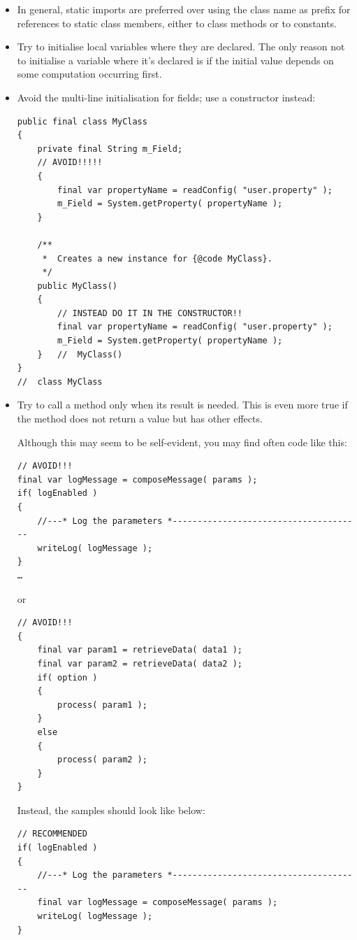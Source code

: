 \documentclass[11pt,a4paper, titlepage, parskip=half, headsepline, footsepline, cleardoublepage=current, headheight=1cm]{scrbook}
\begin{document}
\begin{itemize}
\item{In general, static imports are preferred over using the class name as prefix for references to static class members, either to class methods or to constants.}

\item{Try to initialise local variables where they are declared. The only reason not to initialise a variable where it's declared is if the initial value depends on some computation occurring first.}

\item{Avoid the multi-line initialisation for fields; use a constructor instead:
\begin{lstlisting}
public final class MyClass
{
    private final String m_Field;
    // AVOID!!!!!
    {                                                
        final var propertyName = readConfig( "user.property" );
        m_Field = System.getProperty( propertyName );
    }
    
    /**
     *  Creates a new instance for {@code MyClass}.
     */
    public MyClass() 
    {                                                
        // INSTEAD DO IT IN THE CONSTRUCTOR!!
        final var propertyName = readConfig( "user.property" );
        m_Field = System.getProperty( propertyName );
    }   //  MyClass()
}
//  class MyClass    
\end{lstlisting}}

\item{Try to call a method only when its result is needed. This is even more true if the method does not return a value but has other effects.

Although this may seem to be self-evident, you may find often code like this:
\begin{lstlisting}
// AVOID!!!
final var logMessage = composeMessage( params );
if( logEnabled )
{
    //---* Log the parameters *--------------------------------------
    writeLog( logMessage );
}
…
\end{lstlisting}
or
\begin{lstlisting}
// AVOID!!!
{
    final var param1 = retrieveData( data1 );
    final var param2 = retrieveData( data2 );
    if( option )
    {
        process( param1 );
    }
    else
    {
        process( param2 );
    }
}
\end{lstlisting}
Instead, the samples should look like below:
\begin{lstlisting}
// RECOMMENDED
if( logEnabled )
{
    //---* Log the parameters *--------------------------------------
    final var logMessage = composeMessage( params );
    writeLog( logMessage );
}


\end{lstlisting}}
\end{itemize}
\end{document}
